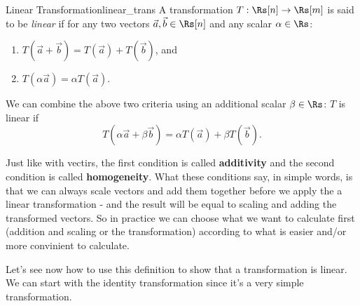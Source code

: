 \begin{definition}{Linear Transformation}{linear_trans}
	A transformation $T:\Rs[n]\to\Rs[m]$ is said to be \textit{linear} if for any two vectors $\vec{a},\vec{b}\in\Rs[n]$ and any scalar $\alpha\in\Rs$:
	\begin{enumerate}
		\item $T\left(\vec{a}+\vec{b}\right) = T(\vec{a})+T(\vec{b})$, and
		\item $T\left(\alpha \vec{a}\right) = \alpha T(\vec{a})$.
	\end{enumerate}

	We can combine the above two criteria using an additional scalar $\beta\in\Rs$: $T$ is linear if $$ T(\alpha\vec{a} + \beta\vec{b}) = \alpha T(\vec{a}) + \beta T(\vec{b}).$$
\end{definition}

Just like with vectirs, the first condition is called \textbf{additivity} and the second condition is called \textbf{homogeneity}. What these conditions say, in simple words, is that we can always scale vectors and add them together before we apply the a linear transformation - and the result will be equal to scaling and adding the transformed vectors. So in practice we can choose what we want to calculate first (addition and scaling or the transformation) according to what is easier and/or more convinient to calculate.

Let's see now how to use this definition to show that a transformation is linear. We can start with the identity transformation since it's a very simple transformation.

